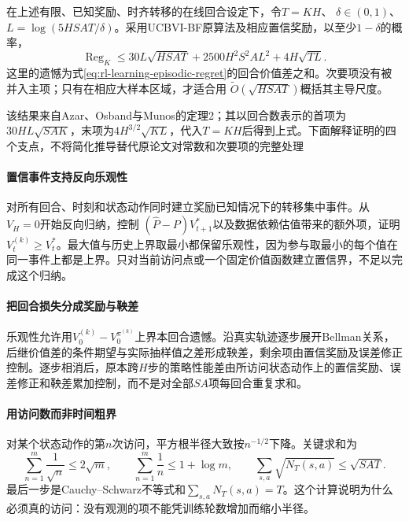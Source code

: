 \begin{theorem}
  \label{thm:rl-learning-ucbvi}
  在上述有限、已知奖励、时齐转移的在线回合设定下，令$T=KH$、
  $\delta\in(0,1)$、$L=\log(5HSAT/\delta)$。采用UCBVI-BF原算法及相应置信奖励，以至少$1-\delta$的概率，
  \begin{equation}
    \operatorname{Reg}_K
      \leq30L\sqrt{HSAT}
          +2500H^2S^2AL^2
          +4H\sqrt{TL}.
    \label{eq:rl-learning-ucbvi-bound}
  \end{equation}
  这里的遗憾为式\eqref{eq:rl-learning-episodic-regret}的回合价值差之和。次要项没有被并入主项；只有在相应大样本区域，才适合用
  $\widetilde O(\sqrt{HSAT})$概括其主导尺度。
\end{theorem}

该结果来自Azar、Osband与Munos的定理2；其以回合数表示的首项为$30HL\sqrt{SAK}$，末项为$4H^{3/2}\sqrt{KL}$，代入$T=KH$后得到上式。下面解释证明的四个支点，不将简化推导替代原论文对常数和次要项的完整处理

\paragraph{置信事件支持反向乐观性}
对所有回合、时刻和状态动作同时建立奖励已知情况下的转移集中事件。从$V_H=0$开始反向归纳，控制
$(\widehat P-P)V^*_{t+1}$以及数据依赖估值带来的额外项，证明
$V_t^{(k)}\geq V_t^*$。最大值与历史上界取最小都保留乐观性，因为参与取最小的每个值在同一事件上都是上界。只对当前访问点或一个固定价值函数建立置信界，不足以完成这个归纳。

\paragraph{把回合损失分成奖励与鞅差}
乐观性允许用$V_0^{(k)}-V_0^{\pi^{(k)}}$上界本回合遗憾。沿真实轨迹逐步展开Bellman关系，后继价值差的条件期望与实际抽样值之差形成鞅差，剩余项由置信奖励及误差修正控制。逐步相消后，原本跨$H$步的策略性能差由所访问状态动作上的置信奖励、误差修正和鞅差累加控制，而不是对全部$SA$项每回合重复求和。

\paragraph{用访问数而非时间粗界}
对某个状态动作的第$n$次访问，平方根半径大致按$n^{-1/2}$下降。关键求和为
\[
  \sum_{n=1}^{m}\frac1{\sqrt n}\leq2\sqrt m,\qquad
  \sum_{n=1}^{m}\frac1n\leq1+\log m,\qquad
  \sum_{s,a}\sqrt{N_T(s,a)}\leq\sqrt{SAT}.
\]
最后一步是Cauchy--Schwarz不等式和$\sum_{s,a}N_T(s,a)=T$。这个计算说明为什么必须真的访问：没有观测的项不能凭训练轮数增加而缩小半径。

